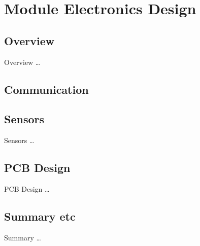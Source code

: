\chapter{Module Electronics Design} \label{Chapter:ModuleElecDesign}

\section{Overview}
Overview \dots

\section{Communication}





\section{Sensors}
Sensors \dots

\section{PCB Design}
PCB Design \dots

\section{Summary etc}
Summary \dots


